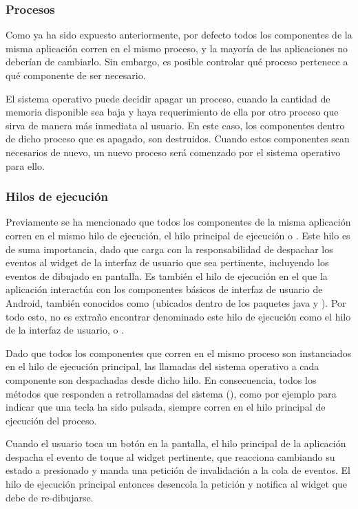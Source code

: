 \subsubsection{Procesos}
    Como ya ha sido expuesto anteriormente, por defecto todos los componentes de la misma aplicación corren en el mismo proceso, y la mayoría de las aplicaciones no deberían de cambiarlo. Sin embargo, es posible controlar qué proceso pertenece a qué componente de ser necesario.

    El sistema operativo puede decidir apagar un proceso, cuando la cantidad de memoria disponible sea baja y haya requerimiento de ella por otro proceso que sirva de manera más inmediata al usuario. En este caso, los componentes dentro de dicho proceso que es apagado, son destruidos. Cuando estos componentes sean necesarios de nuevo, un nuevo proceso será comenzado por el sistema operativo para ello.

\subsubsection{Hilos de ejecución}
    Previamente se ha mencionado que todos los componentes de la misma aplicación corren en el mismo hilo de ejecución, el hilo principal de ejecución o . Este hilo es de suma importancia, dado que carga con la responsabilidad de despachar los eventos al widget de la interfaz de usuario que sea pertinente, incluyendo los eventos de dibujado en pantalla. Es también el hilo de ejecución en el que la aplicación interactúa con los componentes básicos de interfaz de usuario de Android, también conocidos como  (ubicados dentro de los paquetes java  y ). Por todo esto, no es extraño encontrar denominado este hilo de ejecución como el hilo de la interfaz de usuario, o .

    Dado que todos los componentes que corren en el mismo proceso son instanciados en el hilo de ejecución principal, las llamadas del sistema operativo a cada componente son despachadas desde dicho hilo. En consecuencia, todos los métodos que responden a retrollamadas del sistema (), como por ejemplo para indicar que una tecla ha sido pulsada, siempre corren en el hilo principal de ejecución del proceso.

    Cuando el usuario toca un botón en la pantalla, el hilo principal de la aplicación despacha el evento de toque al widget pertinente, que reacciona cambiando su estado a presionado y manda una petición de invalidación a la cola de eventos. El hilo de ejecución principal entonces desencola la petición y notifica al widget que debe de re-dibujarse.

